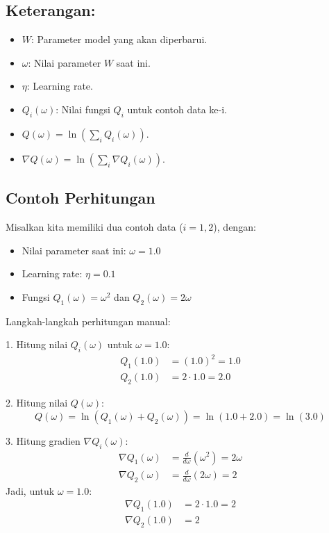 \subsection*{Keterangan:}
\begin{itemize}
    \item \( W \): Parameter model yang akan diperbarui.
    \item \( \omega \): Nilai parameter \( W \) saat ini.
    \item \( \eta \): Learning rate.
    \item \( Q_i(\omega) \): Nilai fungsi \( Q_i \) untuk contoh data ke-i.
    \item \( Q(\omega) = \ln\left(\sum_i Q_i(\omega)\right) \).
    \item \( \nabla Q(\omega) = \ln\left(\sum_i \nabla Q_i(\omega)\right) \).
\end{itemize}


\subsection*{Contoh Perhitungan}
Misalkan kita memiliki dua contoh data (\( i = 1, 2 \)), dengan:
\begin{itemize}
    \item Nilai parameter saat ini: \( \omega = 1.0 \)
    \item Learning rate: \( \eta = 0.1 \)
    \item Fungsi \( Q_1(\omega) = \omega^2 \) dan \( Q_2(\omega) = 2\omega \)
\end{itemize}

Langkah-langkah perhitungan manual:

1. Hitung nilai \( Q_i(\omega) \) untuk \( \omega = 1.0 \):
   \begin{align*}
       Q_1(1.0) & = (1.0)^2 = 1.0 \\
       Q_2(1.0) & = 2 \cdot 1.0 = 2.0
   \end{align*}

2. Hitung nilai \( Q(\omega) \):
   \[
   Q(\omega) = \ln\left(Q_1(\omega) + Q_2(\omega)\right) = \ln(1.0 + 2.0) = \ln(3.0)
   \]

3. Hitung gradien \( \nabla Q_i(\omega) \):
   \begin{align*}
       \nabla Q_1(\omega) & = \frac{d}{d\omega}(\omega^2) = 2\omega \\
       \nabla Q_2(\omega) & = \frac{d}{d\omega}(2\omega) = 2
   \end{align*}
   Jadi, untuk \( \omega = 1.0 \):
   \begin{align*}
       \nabla Q_1(1.0) & = 2 \cdot 1.0 = 2 \\
       \nabla Q_2(1.0) & = 2
   \end{align*}


